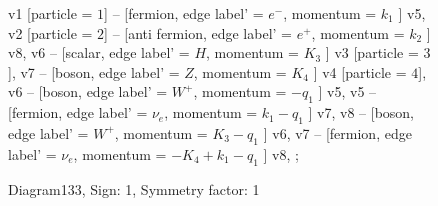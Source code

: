 \documentclass{revtex4}
\begin{document}
\begin{figure}[!htb]
\begin{center}
{    %
v1 [particle = \(1\)] -- [fermion, edge label' = \(e^{-}\), momentum = \(k_{1}\) ] v5, 
v2 [particle = \(2\)] -- [anti fermion, edge label' = \(e^{+}\), momentum = \(k_{2}\) ] v8, 
v6 -- [scalar, edge label' = \(H\), momentum = \(K_{3}\) ] v3 [particle = \(3\)], 
v7 -- [boson, edge label' = \(Z\), momentum = \(K_{4}\) ] v4 [particle = \(4\)], 
v6 -- [boson, edge label' = \(W^{+}\), momentum = \(-q_{1}\) ] v5, 
v5 -- [fermion, edge label' = \(\nu_{e}\), momentum = \(k_{1} - q_{1}\) ] v7, 
v8 -- [boson, edge label' = \(W^{+}\), momentum = \(K_{3} - q_{1}\) ] v6, 
v7 -- [fermion, edge label' = \(\nu_{e}\), momentum = \(-K_{4} + k_{1} - q_{1}\) ] v8, 
};
\end{center}
\caption{Diagram133, Sign: 1, Symmetry factor: 1}
\end{figure}
\newpage
\end{document}

